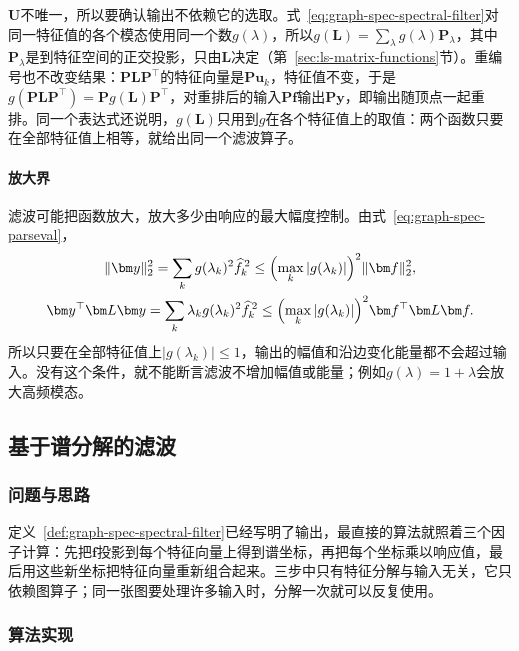 $\bm U$不唯一，所以要确认输出不依赖它的选取。式~\eqref{eq:graph-spec-spectral-filter}对同一特征值的各个模态使用同一个数$g(\lambda)$，所以$g(\bm L)=\sum_\lambda g(\lambda)\bm P_\lambda$，其中$\bm P_\lambda$是到特征空间的正交投影，只由$\bm L$决定（第~\ref{sec:ls-matrix-functions}节）。重编号也不改变结果：$\bm P\bm L\bm P^{\top}$的特征向量是$\bm P\bm u_k$，特征值不变，于是$g(\bm P\bm L\bm P^{\top})=\bm Pg(\bm L)\bm P^{\top}$，对重排后的输入$\bm P\bm f$输出$\bm P\bm y$，即输出随顶点一起重排。同一个表达式还说明，$g(\bm L)$只用到$g$在各个特征值上的取值：两个函数只要在全部特征值上相等，就给出同一个滤波算子。

\paragraph{放大界}
滤波可能把函数放大，放大多少由响应的最大幅度控制。由式~\eqref{eq:graph-spec-parseval}，
\begin{equation}
 \begin{gathered}
 \lVert\bm y\rVert_2^2=\sum_kg(\lambda_k)^2\widehat f_k^{\,2}\leq\Bigl(\max_k|g(\lambda_k)|\Bigr)^2\lVert\bm f\rVert_2^2,\\
 \bm y^{\top}\bm L\bm y=\sum_k\lambda_kg(\lambda_k)^2\widehat f_k^{\,2}\leq\Bigl(\max_k|g(\lambda_k)|\Bigr)^2\bm f^{\top}\bm L\bm f .
 \end{gathered}
 \label{eq:graph-spec-filter-bound}
\end{equation}
所以只要在全部特征值上$|g(\lambda_k)|\leq1$，输出的幅值和沿边变化能量都不会超过输入。没有这个条件，就不能断言滤波不增加幅值或能量；例如$g(\lambda)=1+\lambda$会放大高频模态。

\subsection{基于谱分解的滤波}
\label{sec:graph-spec-eigendecomposition-filter}

\subsubsection{问题与思路}

定义~\ref{def:graph-spec-spectral-filter}已经写明了输出，最直接的算法就照着三个因子计算：先把$\bm f$投影到每个特征向量上得到谱坐标，再把每个坐标乘以响应值，最后用这些新坐标把特征向量重新组合起来。三步中只有特征分解与输入无关，它只依赖图算子；同一张图要处理许多输入时，分解一次就可以反复使用。

\subsubsection{算法实现}

